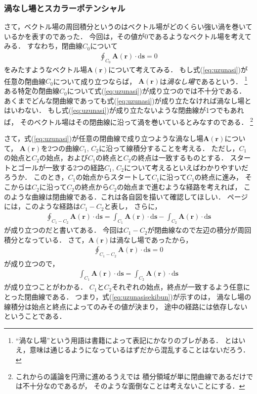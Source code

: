 \subsubsection{渦なし場とスカラーポテンシャル}
さて，ベクトル場の周回積分というのはベクトル場がどのくらい強い渦を巻いているかを表すのであった．
今回は，その値が0であるようなベクトル場を考えてみる．
すなわち，閉曲線$C_0$について
\begin{align}
\oint_{C_0} \bm{A}(\bm{r}) \cdot \mathrm{d} \bm{s} = 0
\label{eq:uzunasi}
\end{align}
をみたすようなベクトル場$\bm{A}(\bm{r})$について考えてみる．
もし式(\ref{eq:uzunasi})が\.任\.意\.の閉曲線$C_0$について成り立つならば，
$\bm{A}(\bm{r})$は\emph{渦なし場}であるという．
\footnote{``渦なし場''という用語は書籍によって表記にかなりのブレがある．
とはいえ，意味は通じるようになっているはずだから混乱することはないだろう．}
ある\.特\.定\.の閉曲線$C_0$について式(\ref{eq:uzunasi})が成り立つのでは不十分である．
あくまでどんな閉曲線であっても式(\ref{eq:uzunasi})が成り立たなければ渦なし場とはいわない．
もし式(\ref{eq:uzunasi})が成り立たないような閉曲線が1つでもあれば，
そのベクトル場はその閉曲線に沿って渦を巻いているとみなすのである．
\footnote{これからの議論を円滑に進めるうえでは
積分領域が単に閉曲線であるだけでは不十分なのであるが，
そのような面倒なことは考えないことにする．}

さて，式(\ref{eq:uzunasi})が任意の閉曲線で成り立つような渦なし場$\bm{A}(\bm{r})$について，
$\bm{A}(\bm{r})$を2つの曲線$C_1, \, C_2$に沿って線積分することを考える．
ただし，$C_1$の始点と$C_2$の始点，および$C_1$の終点と$C_2$の終点は一致するものとする．
スタートとゴールが一致する2つの経路$C_1, \, C_2$について考えるといえばわかりやすいだろうか．
このとき，$C_1$の始点からスタートして$C_1$に沿って$C_1$の終点に進み，
そこからは$C_2$に沿って$C_2$の終点から$C_2$の始点まで進むような経路を考えれば，
このような曲線は閉曲線である．これは各自図を描いて確認してほしい．
\pageref{eq:keirosa}ページには，このような経路は$C_1-C_2$と表し，
さらに，
\begin{align*}
\oint_{C_1-C_2} \bm{A}(\bm{r}) \cdot \mathrm{d}\bm{s}
= \int_{C_1} \bm{A}(\bm{r}) \cdot \mathrm{d} \bm{s} -
\int_{C_2} \bm{A}(\bm{r}) \cdot \mathrm{d} \bm{s}
\end{align*}
が成り立つのだと書いてある．
今回は$C_1-C_2$が閉曲線なので左辺の積分が周回積分となっている．
さて，$\bm{A}(\bm{r})$は渦なし場であったから，
\begin{align*}
\oint_{C_1-C_2} \bm{A}(\bm{r}) \cdot \mathrm{d}\bm{s} = 0
\end{align*}
が成り立つので，
\begin{align}
\int_{C_1} \bm{A}(\bm{r}) \cdot \mathrm{d} \bm{s}
=  \int_{C_2} \bm{A}(\bm{r}) \cdot \mathrm{d} \bm{s}
\label{eq:uzunasisekibun}
\end{align}
が成り立つことがわかる．
$C_1$と$C_2$それぞれの始点，終点が一致するよう任意にとった閉曲線である．
つまり，式(\ref{eq:uzunasisekibun})が示すのは，
渦なし場の線積分は始点と終点によってのみその値が決まり，
途中の経路には依存しないということである．

